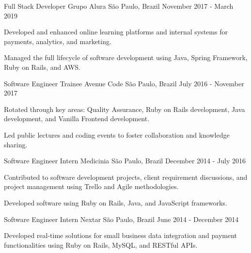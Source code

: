 \begin{cventries}
\cventry
    {Full Stack Developer} %
    {Grupo Alura} %
    {São Paulo, Brazil} %
    {November 2017 - March 2019} %
    {
      \begin{cvitems} %
        \item {Developed and enhanced online learning platforms and internal systems for payments, analytics, and marketing.}
        \item {Managed the full lifecycle of software development using Java, Spring Framework, Ruby on Rails, and AWS.}
      \end{cvitems}
    }

\cventry
    {Software Engineer Trainee} %
    {Avenue Code} %
    {São Paulo, Brazil} %
    {July 2016 - November 2017} %
    {
      \begin{cvitems} %
        \item {Rotated through key areas: Quality Assurance, Ruby on Rails development, Java development, and Vanilla Frontend development.}
        \item {Led public lectures and coding events to foster collaboration and knowledge sharing.}
      \end{cvitems}
    }

\cventry
    {Software Engineer Intern} %
    {Medicinia} %
    {São Paulo, Brazil} %
    {December 2014 - July 2016} %
    {
      \begin{cvitems} %
        \item {Contributed to software development projects, client requirement discussions, and project management using Trello and Agile methodologies.}
        \item {Developed software using Ruby on Rails, Java, and JavaScript frameworks.}
      \end{cvitems}
    }

\cventry
    {Software Engineer Intern} %
    {Nextar} %
    {São Paulo, Brazil} %
    {June 2014 - December 2014} %
    {
      \begin{cvitems} %
        \item {Developed real-time solutions for small business data integration and payment functionalities using Ruby on Rails, MySQL, and RESTful APIs.}
      \end{cvitems}
    }


\end{cventries}
